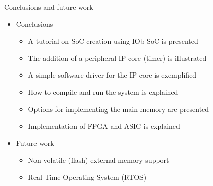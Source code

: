 \documentclass [xcolor=svgnames, t] {beamer}
\begin{document}
\begin{frame}{Conclusions and future work}

\begin{itemize}
  \item Conclusions
    \begin{itemize}
    \item A tutorial on SoC creation using IOb-SoC is presented
    \item The addition of a peripheral IP core (timer) is illustrated
    \item A simple software driver for the IP core is exemplified
    \item How to compile and run the system is explained 
    \item Options for implementing the main memory are presented
    \item Implementation of FPGA and ASIC is explained
    \end{itemize}
  \item Future work
    \begin{itemize}
    \item Non-volatile (flash) external memory support
    \item Real Time Operating System (RTOS) 
    \end{itemize}
\end{itemize}

\end{frame}

\end{document}
